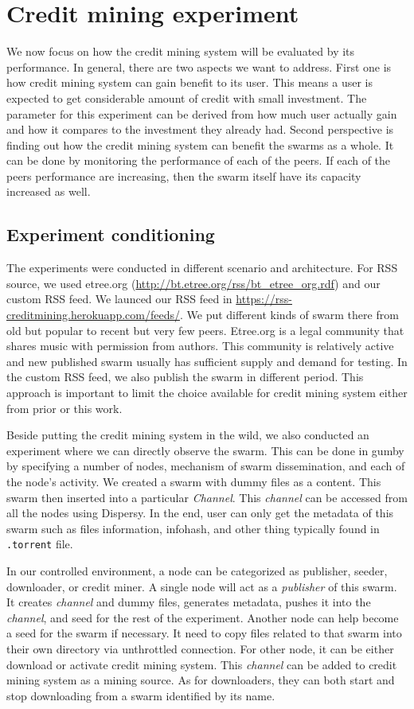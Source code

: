 \section{Credit mining experiment}
\label{section:cmexp}
We now focus on how the credit mining system will be evaluated by its performance. In general, there are two aspects we want to address. First one is how credit mining system can gain benefit to its user. This means a user is expected to get considerable amount of credit with small investment. The parameter for this experiment can be derived from how much user actually gain and how it compares to the investment they already had. Second perspective is finding out how the credit mining system can benefit the swarms as a whole. It can be done by monitoring the performance of each of the peers. If each of the peers performance are increasing, then the swarm itself have its capacity increased as well.

\subsection{Experiment conditioning}
The experiments were conducted in different scenario and architecture. For RSS source, we used etree.org (\url{http://bt.etree.org/rss/bt_etree_org.rdf}) and our custom RSS feed. We launced our RSS feed in \url{https://rss-creditmining.herokuapp.com/feeds/}. We put different kinds of swarm there from old but popular to recent but very few peers. Etree.org is a legal community that shares music with permission from authors. This community is relatively active and new published swarm usually has sufficient supply and demand for testing. In the custom RSS feed, we also publish the swarm in different period. This approach is important to limit the choice available for credit mining system either from prior or this work. 

Beside putting the credit mining system in the wild, we also conducted an experiment where we can directly observe the swarm. This can be done in gumby by specifying a number of nodes, mechanism of swarm dissemination, and each of the node's activity. We created a swarm with dummy files as a content. This swarm then inserted into a particular \textit{Channel}. This \textit{channel} can be accessed from all the nodes using Dispersy. In the end, user can only get the metadata of this swarm such as files information, infohash, and other thing typically found in \texttt{.torrent} file. 

In our controlled environment, a node can be categorized as publisher, seeder, downloader, or credit miner. A single node will act as a \textit{publisher} of this swarm. It creates \textit{channel} and dummy files, generates metadata, pushes it into the \textit{channel}, and seed for the rest of the experiment. Another node can help become a seed for the swarm if necessary. It need to copy files related to that swarm into their own directory via unthrottled connection. For other node, it can be either download or activate credit mining system. This \textit{channel} can be added to credit mining system as a mining source. As for downloaders, they can both start and stop downloading from a swarm identified by its name. 

